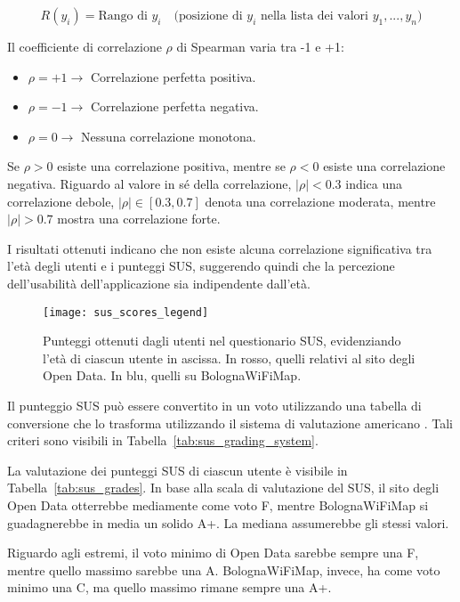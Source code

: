 \begin{equation}
    R(y_i) = \text{Rango di } y_i \quad \text{(posizione di } y_i \text{ nella lista dei valori } y_1, ..., y_n \text{)}
    \label{eq:rank_y}
\end{equation}

Il coefficiente di correlazione \( \rho \) di Spearman varia tra -1 e +1:
\begin{itemize}
    \item \( \rho = +1 \rightarrow \) Correlazione perfetta positiva.
    \item \( \rho = -1 \rightarrow \) Correlazione perfetta negativa.
    \item \( \rho = 0 \rightarrow \) Nessuna correlazione monotona.
\end{itemize}

Se \( \rho > 0 \) esiste una correlazione positiva, mentre se \( \rho < 0 \) esiste una correlazione negativa. Riguardo al valore in sé della correlazione, \( |\rho| < 0.3 \) indica una correlazione debole, \( |\rho| \in [0.3, 0.7] \) denota una correlazione moderata, mentre \( |\rho| > 0.7 \) mostra una correlazione forte.

I risultati ottenuti indicano che non esiste alcuna correlazione significativa tra l'età degli utenti e i punteggi SUS, suggerendo quindi che la percezione dell'usabilità dell'applicazione sia indipendente dall'età.

\begin{figure}[H]
    \centering
    \texttt{[image: sus\_scores\_legend]}
    \caption[Punteggi ottenuti nel questionario SUS]{Punteggi ottenuti dagli utenti nel questionario SUS, evidenziando l'età di ciascun utente in ascissa. In rosso, quelli relativi al sito degli Open Data. In blu, quelli su BolognaWiFiMap.}
    \label{fig:sus_scores}
\end{figure}

Il punteggio SUS può essere convertito in un voto utilizzando una tabella di conversione che lo trasforma utilizzando il sistema di valutazione americano \cite{SUS}. Tali criteri sono visibili in Tabella~\ref{tab:sus_grading_system}.

La valutazione dei punteggi SUS di ciascun utente è visibile in Tabella~\ref{tab:sus_grades}. In base alla scala di valutazione del SUS, il sito degli Open Data otterrebbe mediamente come voto F, mentre BolognaWiFiMap si guadagnerebbe in media un solido A+. La mediana assumerebbe gli stessi valori.

Riguardo agli estremi, il voto minimo di Open Data sarebbe sempre una F, mentre quello massimo sarebbe una A. BolognaWiFiMap, invece, ha come voto minimo una C, ma quello massimo rimane sempre una A+.

